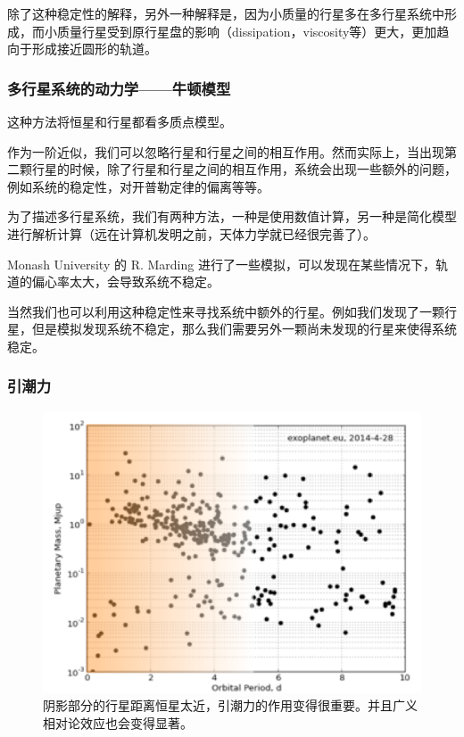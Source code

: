 \documentclass[letterpaper,10pt,english]{sphinxmanual}
\begin{document}
除了这种稳定性的解释，另外一种解释是，因为小质量的行星多在多行星系统中形成，而小质量行星受到原行星盘的影响（dissipation，viscosity等）更大，更加趋向于形成接近圆形的轨道。


\subsubsection{多行星系统的动力学——牛顿模型}
\label{statistics:id16}
这种方法将恒星和行星都看多质点模型。

作为一阶近似，我们可以忽略行星和行星之间的相互作用。然而实际上，当出现第二颗行星的时候，除了行星和行星之间的相互作用，系统会出现一些额外的问题，例如系统的稳定性，对开普勒定律的偏离等等。

为了描述多行星系统，我们有两种方法，一种是使用数值计算，另一种是简化模型进行解析计算（远在计算机发明之前，天体力学就已经很完善了）。

Monash University 的 R. Marding 进行了一些模拟，可以发现在某些情况下，轨道的偏心率太大，会导致系统不稳定。

当然我们也可以利用这种稳定性来寻找系统中额外的行星。例如我们发现了一颗行星，但是模拟发现系统不稳定，那么我们需要另外一颗尚未发现的行星来使得系统稳定。


\subsubsection{引潮力}
\label{statistics:index-0}\label{statistics:id17}\begin{figure}[htbp]
\centering
\capstart

\includegraphics{massVSp.png}
\caption{阴影部分的行星距离恒星太近，引潮力的作用变得很重要。并且广义相对论效应也会变得显著。}\end{figure}
\end{document}
